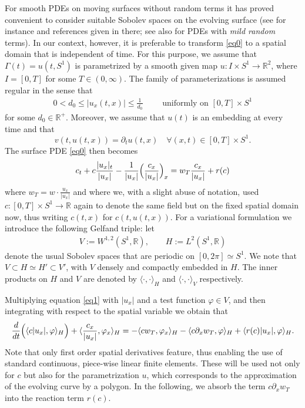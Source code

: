 \documentclass[a4paper,10pt]{article}
\newcommand{\R}{\mathbb{R}}
\numberwithin{equation}{section}
\begin{document}
For smooth PDEs on moving surfaces without random terms it has proved convenient to consider suitable Sobolev spaces on the evolving surface (see for instance \cite{ranner} and references given in there; see also \cite{DEKR} for PDEs with {\it mild random} terms). In our context, however, it is preferable to transform \eqref{eq0} to a spatial domain that is independent of time. For this purpose, we assume that $\Gamma(t) = u(t,S^{1})$ is parametrized by a smooth given map $u: I \times S^{1} \to \R^{2}$, where $I = [0,T]$ for some $T \in (0,\infty)$. The family of parameterizations is assumed regular in the sense that
\begin{align}\label{regularity}
 0<d_{0} \leq |u_{x}(t,x)| \leq \frac{1}{d_{0}} \qquad \text{ uniformly on } [0,T] \times S^{1}
\end{align}
for some $d_0\in\R^{+}$. Moreover, we assume that $u(t)$ is an embedding at every time and that
\[
 v(t,u(t,x)) = \partial_t u(t,x) \quad \forall (x,t) \in [0,T] \times S^{1}.
\]
The surface PDE \eqref{eq0} then becomes
\begin{equation}\label{eq1}
c_t + c \frac{|u_x|_t}{|u_x|} - \frac{1}{|u_x|} \Big{(} \frac{c_x}{|u_x|} \Big{)}_x = w_{T} \frac{c_x}{|u_x|} + r(c)
\end{equation}
where $w_{T} = w \cdot \frac{u_x}{|u_x|}$ and where we, with a slight abuse of notation, used $c : [0,T] \times S^{1} \to \R$ again to denote the same field but on the fixed spatial domain now, thus writing $c(t,x)$ for $c(t,u(t,x))$.
For a variational formulation we introduce the following Gelfand triple: let
\begin{align}\label{VH}
V:= W^{1,2}(S^{1}, \R), \qquad H := L^{2}(S^{1}, \R)
\end{align}
denote the usual Sobolev spaces that are periodic on $[0,2 \pi]\simeq S^{1}$. We note that $V \subset H \simeq H' \subset V'$, with $V$ densely and compactly embedded in $H$. 
The inner products on $H$ and $V$ are denoted by $\langle \cdot, \cdot \rangle_{H}$ and $\langle \cdot, \cdot \rangle_{V}$ respectively.

Multiplying equation \eqref{eq1} with $|u_x|$ and a test function $\varphi \in V$, and then integrating with respect to the spatial variable we obtain that
\begin{equation}\label{eq2}
\frac{d}{dt} \Big{(} \langle c |u_{x}|, \varphi \rangle_{H} \Big{)}
+ \langle \frac{c_{x}}{|u_{x}|}, \varphi_{x} \rangle_{H}
= - \langle c w_{T}, \varphi_{x} \rangle_{H} - \langle c \partial_x w_{T}, \varphi\rangle_{H} + \langle r(c) |u_{x}|, \varphi \rangle_{H}.
\end{equation}
Note that only first order spatial derivatives feature, thus enabling the use of standard continuous, piece-wise linear finite elements. These will be used not only for $c$ but also for the parametrization $u$, which corresponds to the approximation of the evolving curve by a polygon. In the following, we absorb the term $c \partial_x w_{T}$ into the reaction term $r(c)$.
\end{document}
